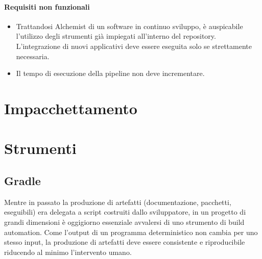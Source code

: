 \paragraph{Requisiti non funzionali}

\begin{itemize}
	\item Trattandosi Alchemist di un software in continuo sviluppo, è auspicabile l'utilizzo degli strumenti già impiegati all'interno del repository. \\ L'integrazione di nuovi applicativi deve essere eseguita solo se strettamente necessaria.
	\item Il tempo di esecuzione della pipeline non deve incrementare.
\end{itemize}

\section{Impacchettamento}

\section{Strumenti}

\subsection{Gradle}

Mentre in passato la produzione di artefatti (documentazione, pacchetti, eseguibili) era delegata a script costruiti dallo sviluppatore, in un progetto di grandi dimensioni è oggigiorno essenziale avvalersi di uno strumento di build automation. Come l'output di un programma deterministico non cambia per uno stesso input, la produzione di artefatti deve essere consistente e riproducibile riducendo al minimo l'intervento umano. 

